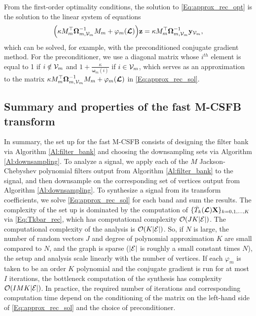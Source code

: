 \documentclass[journal, 10pt]{IEEEtran}
\begin{document}
From the first-order optimality conditions, the solution to \eqref{Eq:approx_rec_opt} is the solution to the linear system of equations
\begin{align}\label{Eq:approx_rec_sol}
\Bigl(\kappa M_m^{\top}{\boldsymbol \Omega}_{m,\V_m}^{-1}M_m+\varphi_m(\L)\Bigr){\bf  z}=\kappa M_m^{\top}{\boldsymbol \Omega}_{m,\V_m}^{-1}{\bf y}_{\V_m},
\end{align}
which can be solved, for example, with the preconditioned conjugate gradient method. For the preconditioner, we use a diagonal matrix whose $i^{th}$ element is equal to 1 if $i \notin {{\mathcal{V}}_m}$ and $1+\frac{\kappa}{{\boldsymbol \omega}_m(i)}$ if $i \in {{\mathcal{V}}_m}$, which serves as an approximation to the matrix $\kappa M_m^{\top}{\boldsymbol \Omega}_{m,{\mathcal{V}}_m}^{-1}M_m+\varphi_m(\boldsymbol{\mathcal{L}})$ in \eqref{Eq:approx_rec_sol}.



\subsection{Summary and properties of the fast M-CSFB transform} \label{Se:fast_prop}
In summary, the set up for the fast M-CSFB consists of designing the filter bank via Algorithm \ref{Al:filter_bank} and choosing the downsampling sets via Algorithm \ref{Al:downsampling}. To analyze a signal, we apply each of the $M$ Jackson-Chebyshev polynomial filters output from Algorithm \ref{Al:filter_bank} to the signal, and then downsample on the corresponding set of vertices output from Algorithm \ref{Al:downsampling}. To synthesize a signal from its transform coefficients, we solve \eqref{Eq:approx_rec_sol} for each band and sum the results. The complexity of the set up is dominated by the computation of $\{\bar{T}_k(\boldsymbol{\mathcal{L}}){\bf X}\}_{k=0,1,\ldots,K}$  via \eqref{Eq:Tkbar_rec}, which has computational complexity ${\cal O}(JK|\E|)$. The computational complexity of the analysis is ${\cal O}(K|\E|)$. So, if $N$ is large, the number of random vectors $J$ and degree of polynomial approximation $K$ are small compared to $N$, and the graph is sparse ($|{\mathcal{E}}|$ is roughly a small constant times $N$), the setup and analysis scale linearly with the number of vertices. If each $\varphi_m$ is taken to be an order $K$ polynomial and the conjugate gradient is run for at most $I$ iterations, the bottleneck computation of the synthesis has complexity ${\cal O}(IMK|\E|)$. In practice, the required number of iterations and corresponding computation time depend on the conditioning of the matrix on the left-hand side of \eqref{Eq:approx_rec_sol} and the choice of preconditioner. %
\end{document}
